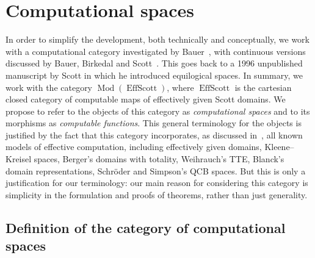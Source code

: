 \documentclass[10pt]{article}
\begin{document}
\section{Computational spaces} \label{remedy}

In order to simplify the development, both technically and
conceptually, we work with a computational category
investigated by Bauer~\cite{bauer:thesis}, with continuous versions discussed
by Bauer, Birkedal and Scott~\cite{bauer:birkedal:scott}. This goes
back to a 1996 unpublished manuscript by Scott in which he introduced
equilogical spaces.  In summary, we work with the category
$\operatorname{Mod}(\operatorname{EffScott})$, where
$\operatorname{EffScott}$ is the cartesian closed category of
computable maps of effectively given Scott domains. We propose to
refer to the objects of this category as \emph{computational spaces}
and to its morphisms as \emph{computable functions}.  This general
terminology for the objects is justified by the fact that this
category incorporates, as discussed
in~\cite{bauer:birkedal:scott,MR1948051}, all known models of
effective computation, including effectively given domains,
Kleene--Kreisel spaces, Berger's domains with totality, Weihrauch's
TTE, Blanck's domain representations, Schr\"oder and Simpson's QCB
spaces. But this is only a justification for our terminology: our main
reason for considering this category is simplicity in the formulation
and proofs of theorems, rather than just generality.

\subsection{Definition of the category of computational spaces}
\end{document}
